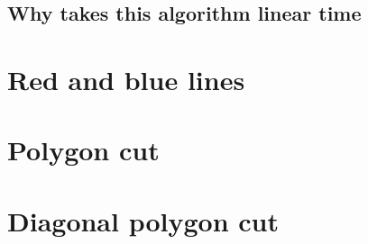 \documentclass{article}
\begin{document}
\begin{empfile}
\subsection{Why takes this algorithm linear time}
\section{Red and blue lines}
\section{Polygon cut}
\section{Diagonal polygon cut}
\end{empfile}
\end{document}
